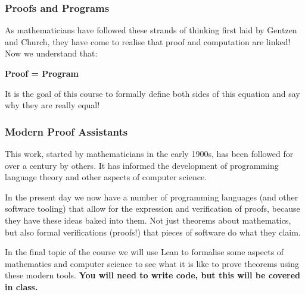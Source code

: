 \documentclass{beamer}
\begin{document}
\begin{frame}
	\frametitle{Proofs and Programs}

	As mathematicians have followed these strands of thinking first laid by Gentzen and Church, they have come to realise that proof and computation are linked! Now we understand that: 

	\vspace{5mm}

	\begin{center}
		\textbf{Proof = Program}
	\end{center}

	\vfill

	It is the goal of this course to formally define both sides of this equation and say why they are really equal!

\end{frame}

\begin{frame}
	\frametitle{Modern Proof Assistants}

	This work, started by mathematicians in the early 1900s, has been followed for over a century by others. It has informed the development of programming language theory and other aspects of computer science. 

	\vspace{5mm}

	In the present day we now have a number of programming languages (and other software tooling) that allow for the expression and verification of proofs, because they have these ideas baked into them. Not just theorems about mathematics, but also formal verifications (proofs!) that pieces of software do what they claim. 

	\vspace{5mm}

	In the final topic of the course we will use Lean to formalise some aspects of mathematics and computer science to see what it is like to prove theorems using these modern tools. \textbf{You will need to write code, but this will be covered in class.}
\end{frame}
\end{document}
